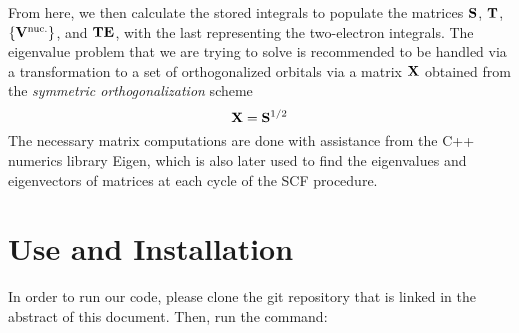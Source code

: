 \documentclass[%
 aip,
 amsmath,amssymb,
 reprint,%
]{revtex4-1}
\begin{document}
From here, we then calculate the stored integrals to populate the matrices 
$\bold{S}$, $\bold{T}$, $\left\{\bold{V}^{\text{nuc.}}\right\}$, and $\bold{TE}$,
with the last representing the two-electron integrals. The eigenvalue problem
that we are trying to solve is recommended to be handled via a transformation
to a set of orthogonalized orbitals via a matrix $\bold{X}$ obtained from 
the \emph{symmetric orthogonalization} scheme
%
\begin{equation}
\bold{X} = \bold{S}^{1/2}
\end{equation}
%
The necessary matrix computations are done with assistance from the C++
numerics library Eigen\cite{eigenweb}, which is also later used to find the 
eigenvalues and eigenvectors of matrices at each cycle of the SCF procedure.


\section{Use and Installation}
In order to run our code, please clone the git repository that is linked in
the abstract of this document. Then, run the command: 



\end{document}
